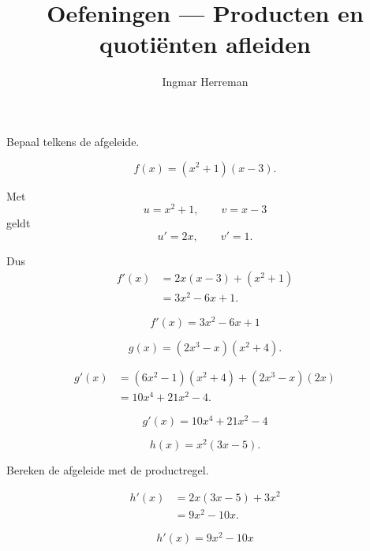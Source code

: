 \documentclass{ximera}
\title{Oefeningen — Producten en quotiënten afleiden}
\author{Ingmar Herreman}
\begin{document}










\maketitle




\FVDbeginExercises



\begin{oefening}{\oefB\ESS}

Bepaal telkens de afgeleide.

\begin{question}
\[
f(x)=(x^2+1)(x-3).
\]

\begin{oplossing}
Met
\[
u=x^2+1,
\qquad
v=x-3
\]
geldt
\[
u'=2x,
\qquad
v'=1.
\]

Dus
\[
\begin{aligned}
f'(x)
&=2x(x-3)+(x^2+1)\\
&=3x^2-6x+1.
\end{aligned}
\]

\[
\boxed{f'(x)=3x^2-6x+1}
\]
\end{oplossing}
\end{question}


\begin{question}
\[
g(x)=(2x^3-x)(x^2+4).
\]

\begin{oplossing}
\[
\begin{aligned}
g'(x)
&=(6x^2-1)(x^2+4)
 +(2x^3-x)(2x)\\
&=10x^4+21x^2-4.
\end{aligned}
\]

\[
\boxed{g'(x)=10x^4+21x^2-4}
\]
\end{oplossing}
\end{question}


\begin{question}
\[
h(x)=x^2(3x-5).
\]

Bereken de afgeleide met de productregel.

\begin{oplossing}
\[
\begin{aligned}
h'(x)
&=2x(3x-5)+3x^2\\
&=9x^2-10x.
\end{aligned}
\]

\[
\boxed{h'(x)=9x^2-10x}
\]
\end{oplossing}
\end{question}

\end{oefening}
\end{document}
